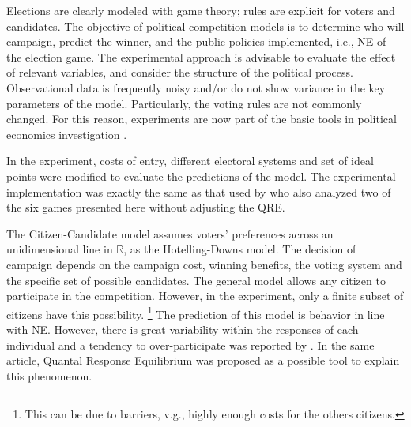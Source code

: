Elections are clearly modeled with game theory; rules are explicit for voters and candidates.
The objective of political competition models is to determine who will campaign, predict the winner, and the public policies implemented, i.e., NE of the election game.
The experimental approach is advisable to evaluate the effect of relevant variables, and consider the structure of the political process.
Observational data is frequently noisy and/or do not show variance in the key parameters of the model. Particularly, the voting rules are not commonly changed. For this reason, experiments are now part of the basic tools in political economics investigation \cite{Palfrey2009}.

In the experiment, costs of entry, different electoral systems and set of ideal points were modified to evaluate the predictions of the model.
The experimental implementation was exactly the same as that used by  who also analyzed two of the six games presented here without adjusting the QRE.

The Citizen-Candidate model assumes voters' preferences across an unidimensional line in $\mathbb{R}$, as the Hotelling-Downs model.
The decision of campaign depends on the campaign cost, winning benefits, the voting system and the specific set of possible candidates. 
The general model allows any citizen to participate in the competition. 
However, in the experiment, only a finite subset of citizens have this possibility. \footnote{This can be due to barriers, v.g., highly enough costs for the others citizens.} 
The prediction of this model is behavior in line with NE. However, there is great variability within the responses of each individual and a tendency to over-participate was reported by . 
In the same article, Quantal Response Equilibrium was proposed as a possible tool to explain this phenomenon.


